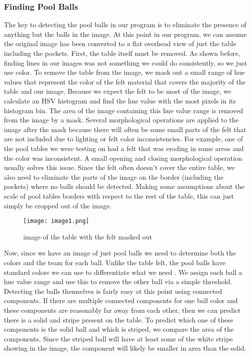 \documentclass[12pt]{report}
\begin{document}
\subsubsection*{Finding Pool Balls}
	The key to detecting the pool balls in our program is to eliminate the presence of anything but the balls in the image. At this point in our program, we can assume the original image has been converted to a flat overhead view of just the table including the pockets. First, the table itself must be removed. As shown before, finding lines in our images was not something we could do consistently, so we just use color. To remove the table from the image, we mask out a small range of hue values that represent the color of the felt material that covers the majority of the table and our image. Because we expect the felt to be most of the image, we calculate an HSV histogram and find the hue value with the most pixels in its histogram bin. The area of the image containing this hue value range is removed from the image by a mask. Several morphological operations are applied to the image after the mask because there will often be some small parts of the felt that are not included due to lighting or felt color inconsistencies. For example, one of the pool tables we were testing on had a felt that was eroding in some areas and the color was inconsistent. A small opening and closing morphological operation usually solves this issue. Since the felt often doesn’t cover the entire table, we also need to eliminate the parts of the image on the border (including the pockets) where no balls should be detected. Making some assumptions about the scale of pool tables borders with respect to the rest of the table, this can just simply be cropped out of the image.
	
	\begin{figure}[htp]
    \centering
    \texttt{[image: image1.png]}
    \caption{image of the table with the felt masked out}
    \label{fig:feltmask}
    \end{figure}
 
	Now, since we have an image of just pool balls we need to determine both the colors and the team for each ball. Unlike the table felt, the pool balls have standard colors we can use to differentiate what we need \cite{Vachaspati:2013qr}. We assign each ball a hue value range and use this to remove the other ball via a simple threshold. Detecting the balls themselves is fairly easy at this point using connected components. If there are multiple connected components for one ball color and these components are reasonably far away from each other, then we can predict there is a solid and stripe present on the table. To predict which one of these components is the solid ball and which is striped, we compare the area of the components. Since the striped ball will have at least some of the white stripe showing in the image, the component will likely be smaller in area than the solid.
 
\end{document}
